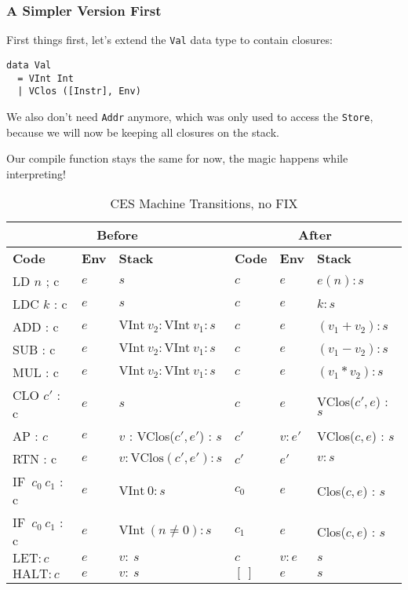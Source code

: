 \subsubsection{A Simpler Version First}

First things first, let's extend the \texttt{Val} data type to contain closures:
\begin{lstlisting}
data Val
  = VInt Int
  | VClos ([Instr], Env)
\end{lstlisting}

We also don't need \texttt{Addr} anymore, which was only used to access the \texttt{Store},
because we will now be keeping all closures on the stack.

Our compile function stays the same for now, the magic happens while interpreting!

\begin{table}[h]
    \centering
    \begin{tabular}{|l|l|l||l|l|l|}
        \hline
        \multicolumn{3}{|c||}{\textbf{Before}} & \multicolumn{3}{c|}{\textbf{After}} \\
        \hline
        \textbf{Code} & \textbf{Env} & \textbf{Stack} & \textbf{Code} & \textbf{Env} & \textbf{Stack} \\
        \hline
        LD \(n\) ; c & \( e \) & \( s \) & \( c \) & \( e \) & \( e(n) : s \) \\
        LDC \(k\) : c & \( e \) & \( s \) & \( c \) & \( e \) & \( k : s \) \\
        ADD : c & \( e \) & \( \text{VInt} \ v_2 : \text{VInt} \ v_1 : s \) & \( c \) & \( e \) & \( (v_1 + v_2) : s \) \\
        SUB : c & \( e \) & \( \text{VInt} \ v_2 : \text{VInt} \ v_1 : s \) & \( c \) & \( e \) & \( (v_1 - v_2) : s \) \\
        MUL : c & \( e \) & \( \text{VInt} \ v_2 : \text{VInt} \ v_1 : s \) & \( c \) & \( e \) & \( (v_1 * v_2) : s \) \\
        \hline
        CLO \(c'\) : c & \( e \) & \( s \) & \( c \) & \( e \) & VClos(\( c' , e \)) : \( s \) \\
        AP : \(c\) & \( e \) & \( v \) : VClos(\( c' , e' \)) : \( s \) & \( c' \) & \( v : e' \) & VClos(\( c , e \)) : \( s \) \\
        RTN : c & \( e \) & \( v : \text{VClos}(c', e') : s \) & \( c' \) & \( e' \) & \( v : s \) \\
        \hline
        IF\ \( c_0 \ c_1 \) : c & \( e \) & \( \text{VInt} \ 0 : s \) & \( c_0 \) & \( e \) & Clos(\( c, e \)) : \( s \) \\
        IF\ \( c_0 \ c_1 \) : c & \( e \) & \( \text{VInt} \ (n \neq 0) : s \) & \( c_1 \) & \( e \) & Clos(\( c, e \)) : \( s \) \\
        \hline
        \( \text{LET} : c \) & \( e \) & \( v : \ s \) & \( c \) & \( v : e \) & \( s \) \\
        \( \text{HALT} : c \) & \( e \) & \( v : \ s \) & \( [ \ ] \) & \( e \) & \( s \) \\
        \hline
    \end{tabular}
    \caption{CES Machine Transitions, no FIX}
\end{table}

